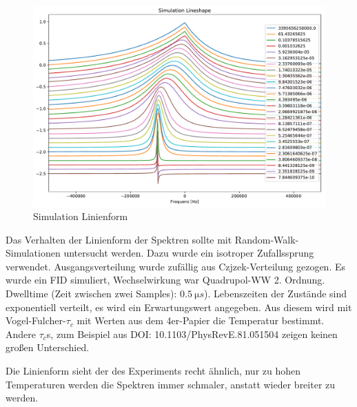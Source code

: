 \begin{figure}
	\begin{center}
		\includegraphics[width=\textwidth]{graphics/plots/SIM/sim_lineshape.pdf}
	\end{center}
	\caption{Simulation Linienform} \label{fig:res:sim_linienform}
\end{figure}
Das Verhalten der Linienform der Spektren sollte mit Random-Walk-Simulationen untersucht werden. Dazu wurde ein isotroper Zufallssprung verwendet. Ausgangsverteilung wurde zufällig aus Czjzek-Verteilung gezogen. Es wurde ein FID simuliert, Wechselwirkung war Quadrupol-WW 2. Ordnung. Dwelltime (Zeit zwischen zwei Samples): $\SI{0.5}{\micro s}$). Lebenszeiten der Zustände sind exponentiell verteilt, es wird ein Erwartungswert angegeben. Aus diesem wird mit Vogel-Fulcher-$\tau_{c}$ mit Werten aus dem 4er-Papier die Temperatur bestimmt. Andere $\tau_c$s, zum Beispiel aus DOI: 10.1103/PhysRevE.81.051504 zeigen keinen großen Unterschied.

Die Linienform sieht der des Experiments recht ähnlich, nur zu hohen Temperaturen werden die Spektren immer schmaler, anstatt wieder breiter zu werden.







